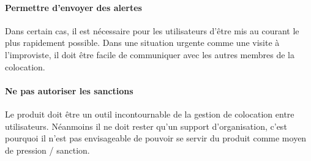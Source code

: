 \paragraph{Permettre d'envoyer des alertes \\}
Dans certain cas, il est nécessaire pour les utilisateurs d'être mis au courant le plus rapidement possible. Dans une situation urgente comme une visite à l'improviste, il doit être facile de communiquer avec les autres membres de la colocation.

\paragraph{Ne pas autoriser les sanctions \\}
Le produit doit être un outil incontournable de la gestion de colocation entre utilisateurs. Néanmoins il ne doit rester qu'un support d'organisation, c'est pourquoi il n'est pas envisageable de pouvoir se servir du produit comme moyen de pression / sanction. 